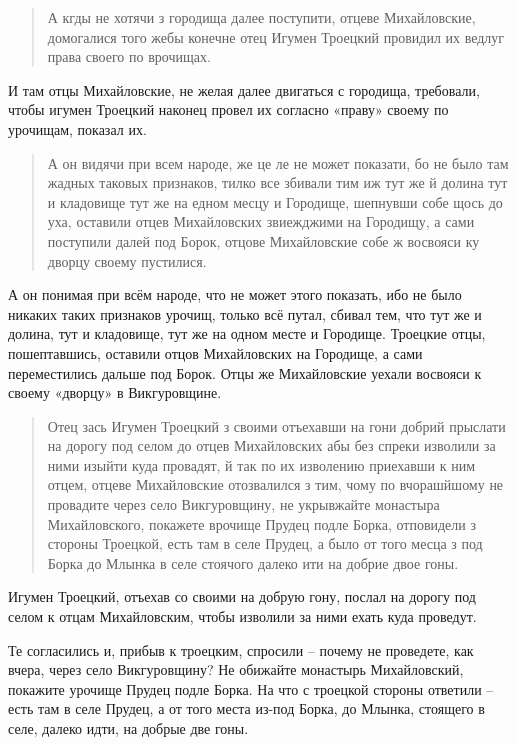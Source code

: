 \begin{quotation}
А кгды не хотячи з городища далее поступити, отцеве Михайловские, домогалися того жебы конечне отец Игумен Троецкий провидил их ведлуг права своего по врочищах.
\end{quotation}

И там отцы Михайловские, не желая далее двигаться с городища, требовали, чтобы игумен Троецкий наконец провел их согласно «праву» своему по урочищам, показал их.

\begin{quotation}
А он видячи при всем народе, же це ле не может показати, бо не было там жадных таковых признаков, тилко все збивали тим иж тут же й долина тут и кладовище тут же на едном месцу и Городище, шепнувши собе щось до уха, оставили отцев Михайловских звиежджими на Городищу, а сами поступили далей под Борок, отцове Михайловские собе ж восвояси ку дворцу своему пустилися.
\end{quotation}

А он понимая при всём народе, что не может этого показать, ибо не было никаких таких признаков урочищ, только всё путал, сбивал тем, что тут же и долина, тут и кладовище, тут же на одном месте и Городище. Троецкие отцы, пошептавшись, оставили отцов Михайловских на Городище, а сами переместились дальше под Борок. Отцы же Михайловские уехали восвояси к своему «дворцу» в Викгуровщине.

\begin{quotation}
Отец зась Игумен Троецкий з своими отъехавши на гони добрий прыслати на дорогу под селом до отцев Михайловских абы без спреки изволили за ними изыйти куда провадят, й так по их изволению приехавши к ним отцем, отцеве Михайловские отозвалился з тим, чому по вчорашйшому не провадите через село Викгуровщину, не укрывжайте монастыра Михайловского, покажете врочище Прудец подле Борка, отповидели з стороны Троецкой, есть там в селе Прудец, а было от того месца з под Борка до Млынка в селе стоячого далеко ити на добрие двое гоны.
\end{quotation}

Игумен Троецкий, отъехав со своими на добрую гону, послал на дорогу под селом к отцам Михайловским, чтобы изволили за ними ехать куда проведут.

Те согласились и, прибыв к троецким, спросили – почему не проведете, как вчера, через село Викгуровщину? Не обижайте монастырь Михайловский, покажите урочище Прудец подле Борка. На что с троецкой стороны ответили – есть там в селе Прудец, а от того места из-под Борка, до Млынка, стоящего в селе, далеко идти, на добрые две гоны.

